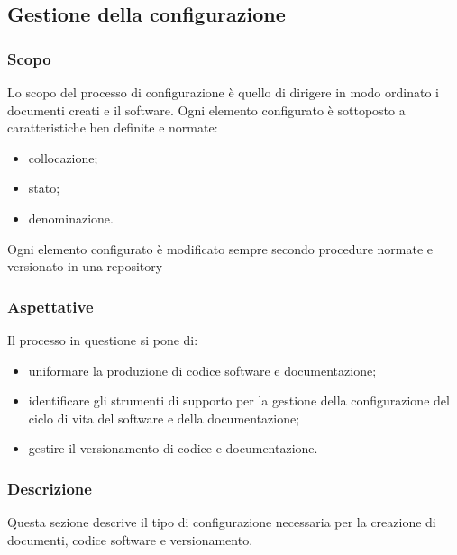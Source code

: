 \subsection{Gestione della configurazione}\label{3.2}

\subsubsection{Scopo}\label{3.2.1}
Lo scopo del processo di configurazione è quello di dirigere in modo ordinato i documenti creati e il software. Ogni elemento configurato è sottoposto a caratteristiche ben definite e normate:
\begin{itemize}
 \item collocazione;
 \item stato;
 \item denominazione.
\end{itemize}
Ogni elemento configurato è modificato sempre secondo procedure normate e versionato in una repository

\subsubsection{Aspettative}
Il processo in questione si pone di:
\begin{itemize}
\item uniformare la produzione di codice software e documentazione;
\item identificare gli strumenti di supporto per la gestione della configurazione del ciclo di vita del software e della documentazione;
\item gestire il versionamento di codice e documentazione.
\end{itemize}


\subsubsection{Descrizione}
Questa sezione descrive il tipo di configurazione necessaria per la creazione di documenti, codice software e versionamento.


